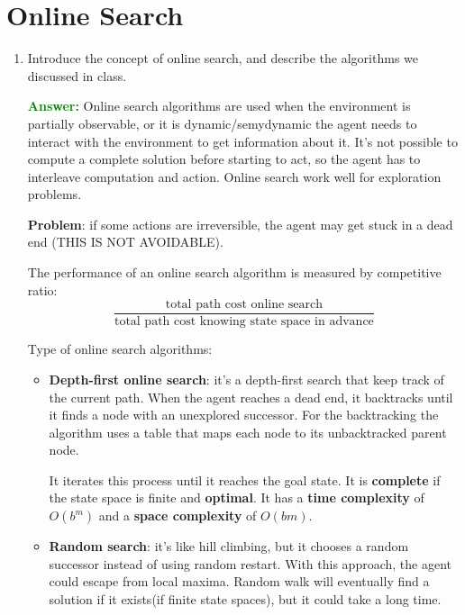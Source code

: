 \documentclass[12pt]{article}
\begin{document}
\section{Online Search}\label{onlinesearch}
\begin{enumerate}[label=\textbf{OS.\arabic*}]
    \item Introduce the concept of online search, and describe the algorithms we discussed in class.
    
    \textcolor{green}{\textbf{Answer:}}
    Online search algorithms are used when the environment is partially observable, or it is dynamic/semydynamic 
    the agent needs to interact with the environment to get information about it.
    It's not possible to compute a complete solution before starting to act, so the agent has to interleave computation and action.
    Online search work well for exploration problems.
    
    \textbf{Problem}: if some actions are irreversible, the agent may get stuck in a dead end (THIS IS NOT AVOIDABLE).

    The performance of an online search algorithm is measured by competitive ratio:
    \begin{equation}
        \frac{\text{total path cost online search}}{\text{total path cost knowing state space in advance}}
        \label{eq:competitive-ratio}
    \end{equation}

    Type of online search algorithms:
    \begin{itemize}
        \item \textbf{Depth-first online search}: it's a depth-first search that keep track of the current path.
        When the agent reaches a dead end, it backtracks until it finds a node with an unexplored successor.
        For the backtracking the algorithm uses a table that maps each node to its unbacktracked parent node.

        It iterates this process until it reaches the goal state.
        It is \textbf{complete} if the state space is finite and \textbf{optimal}.
        It has a \textbf{time complexity} of $O(b^m)$ and a \textbf{space complexity} of $O(bm)$.
        \item \textbf{Random search}: it's like hill climbing, but it chooses a random successor instead of using random restart.
        With this approach, the agent could escape from local maxima.
        Random walk will eventually find a solution if it exists(if finite state spaces), but it could take a long time.
        

\end{itemize}
\end{enumerate}
\end{document}
